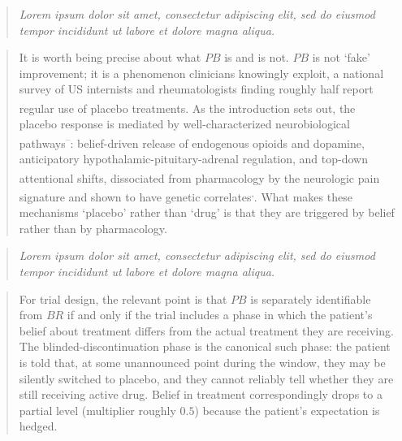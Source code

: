 \documentclass[
  11pt,
]{article}
\newenvironment{rgt}{%
  \begin{quote}\small\itshape\color[RGB]{20,60,160}}{%
  \end{quote}}
\newenvironment{orig}{%
  \begin{quote}\normalsize\color[gray]{0.55}}{%
  \end{quote}}
\begin{document}
\begin{rgt}
Lorem ipsum dolor sit amet, consectetur adipiscing elit, sed do eiusmod tempor incididunt ut labore et dolore magna aliqua.

\end{rgt}

\begin{orig}
It is worth being precise about what \(PB\) is and is not. \(PB\)
is not `fake' improvement; it is a phenomenon clinicians
knowingly exploit, a national survey of US internists and
rheumatologists finding roughly half report regular use of
placebo treatments\textsuperscript{}. As the introduction sets out,
the placebo response is mediated by well-characterized
neurobiological pathways\textsuperscript{--}:
belief-driven release of endogenous opioids and dopamine,
anticipatory hypothalamic-pituitary-adrenal regulation, and
top-down attentional shifts, dissociated from pharmacology by the\textsuperscript{} neurologic pain signature\textsuperscript{} and
shown to have genetic correlates\textsuperscript{,}.
What makes these mechanisms `placebo' rather than `drug' is that
they are triggered by belief rather than by pharmacology.

\end{orig}

\begin{rgt}
Lorem ipsum dolor sit amet, consectetur adipiscing elit, sed do eiusmod tempor incididunt ut labore et dolore magna aliqua.

\end{rgt}

\begin{orig}
For trial design, the relevant point is that \(PB\) is separately
identifiable from \(BR\) if and only if the trial includes a phase
in which the patient's belief about treatment differs from the
actual treatment they are receiving. The blinded-discontinuation
phase is the canonical such phase: the patient is told that, at
some unannounced point during the window, they may be silently
switched to placebo, and they cannot reliably tell whether they
are still receiving active drug. Belief in treatment
correspondingly drops to a partial level (multiplier roughly
\(0.5\)) because the patient's expectation is hedged.

\end{orig}
\end{document}
